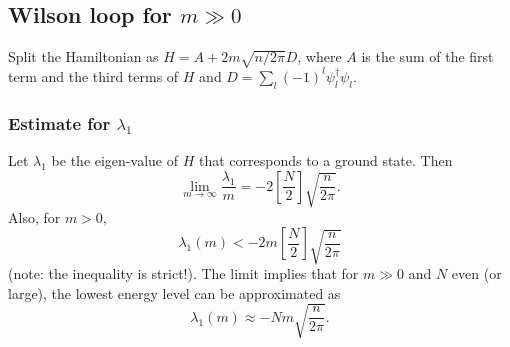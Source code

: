 \subsection{Wilson loop for $m \gg 0$}
Split the Hamiltonian as $H = A + 2m\sqrt{n/2\pi} D$, where $A$ is the sum of the first term and the third terms of $H$ and $D = \sum_l (-1)^l \psi_l^\dagger \psi_l$.
\subsubsection{Estimate for $\lambda_1$}
\begin{proposition}\label{p:lambda_est_pos}
Let $\lambda_1$ be the eigen-value of $H$ that corresponds to a ground state. Then
\[
\lim_{m \rightarrow \infty} \frac{\lambda_1}{m} = -2\left[\frac{N}{2}\right]\sqrt{\frac{n}{2\pi}}.
\]
Also, for $m > 0$,
\[
\lambda_1(m) < -2m\left[\frac{N}{2}\right]\sqrt{\frac{n}{2\pi}}
\]
(note: the inequality is strict!). The limit implies that for $m \gg 0$ and $N$ even (or large), the lowest energy level can be approximated as 
\[
\lambda_1(m) \approx - Nm \sqrt{\frac{n}{2\pi}}.
\]
\end{proposition}

